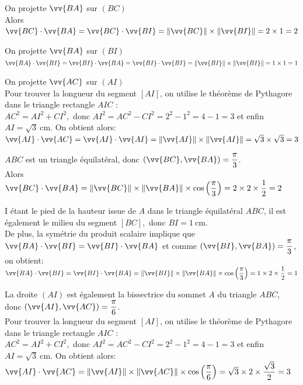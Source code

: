 \documentclass[11pt,a4paper]{article}  %
\begin{document}
\begin{corrBox}
	\begin{enumMet}
		\item On projette $\vv{BA}$ sur $(BC)$\\
		Alors $\vv{B C} \cdot \vv{B A}=\vv{B C} \cdot \vv{B I}=\|\vv{B C}\| \times\|\vv{B I}\|=2 \times 1=2$
		\item On projette $\vv{BA}$ sur $(BI)$\\
		$\vv{B A} \cdot \vv{B I}=\vv{B I} \cdot \vv{B A}=\vv{B I} \cdot \vv{B I}=\|\vv{B I}\| \times\|\vv{B I}\|=1 \times 1=1$
		\item On projette $\vv{AC}$ sur $(AI)$\\
		Pour trouver la longueur du segment $[A I]$, on utilise le théorème de Pythagore dans le triangle rectangle $A I C$ :\\
		$A C^{2}=A I^{2}+C I^{2},$ donc $A I^{2}=A C^{2}-C I^{2}=2^{2}-1^{2}=4-1=3$ et enfin
		$A I=\sqrt{3} \mathrm{~cm} .$ On obtient alors:\\
		$\vv{A I} \cdot \vv{A C}=\vv{A I} \cdot \vv{A I}=\|\vv{A I}\| \times\|\vv{A I}\| =\sqrt{3} \times \sqrt{3}=3$
	\end{enumMet}	
	\begin{enumMet}
		\item $A B C$ est un triangle équilatéral, donc $(\vv{B C}, \vv{B A})=\dfrac{\pi}{3}$.\\
		Alors $\vv{B C} \cdot \vv{B A}=\|\vv{B C}\| \times\|\vv{B A}\| \times \cos \left(\dfrac{\pi}{3}\right)=2 \times 2 \times \dfrac{1}{2}=2$
		\item I étant le pied de la hauteur issue de $A$ dans le triangle équilatéral $A B C$, il est également le milieu du segment $[B C],$ donc $B I=1 \mathrm{~cm}$.\\
		De plus, la symétrie du produit scalaire implique que $\vv{B A} \cdot \vv{B I}=\vv{B I} \cdot \vv{B A}$ et comme $(\vv{B I}, \vv{B A})=\dfrac{\pi}{3}$, on obtient:\\
		$\vv{B A} \cdot \vv{B I}=\vv{B I} \cdot \vv{B A}=\|\vv{B I}\| \times\|\vv{B A}\| \times \cos \left(\dfrac{\pi}{3}\right)=1 \times 2 \times \dfrac{1}{2}=1$
		\item La droite $(A I)$ est également la bissectrice du sommet $A$ du triangle $A B C$, donc $(\vv{A I}, \vv{A C})=\dfrac{\pi}{6}$.\\
		Pour trouver la longueur du segment $[A I]$, on utilise le théorème de Pythagore dans le triangle rectangle $A I C$ :\\
		$A C^{2}=A I^{2}+C I^{2},$ donc $A I^{2}=A C^{2}-C I^{2}=2^{2}-1^{2}=4-1=3$ et enfin
		$A I=\sqrt{3} \mathrm{~cm} .$ On obtient alors:\\
		$\vv{A I} \cdot \vv{A C}=\|\vv{A I}\| \times\|\vv{A C}\| \times \cos \left(\dfrac{\pi}{6}\right)=\sqrt{3} \times 2 \times \dfrac{\sqrt{3}}{2}=3$
	\end{enumMet}	
\end{corrBox}
\end{document}
